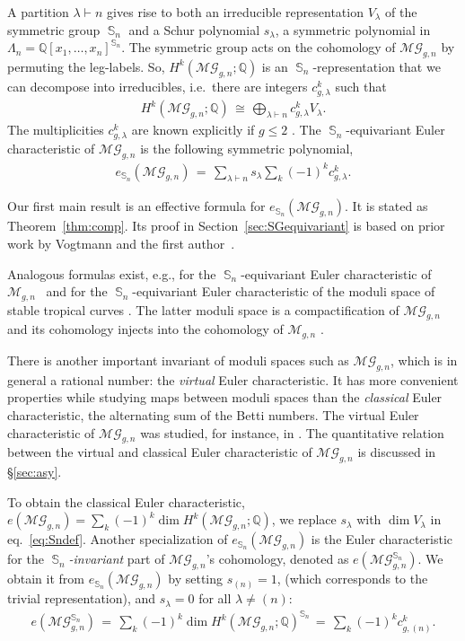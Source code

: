 \documentclass[oneside]{amsart}
\theoremstyle{remark}
\newcommand{\Q}{\mathbb{Q}}
\DeclareMathOperator{\SG}{{\mathbb S}}
\newcommand{\parts}{\vdash}
\newcommand{\MG}{\mathcal{MG}}
\begin{document}
%
%
%

%
%
%
A partition $\lambda \parts n$ gives rise to both an irreducible representation $V_\lambda$ of the symmetric group $\SG_n$ and a Schur polynomial $s_\lambda$, a symmetric polynomial in $\Lambda_n = \Q[x_1,\ldots,x_n]^{\SG_n}$. 
The symmetric group acts on the cohomology of $\MG_{g,n}$ by permuting the leg-labels. 
So, $H^k(\MG_{g,n};\Q)$ is an $\SG_n$-representation that we can decompose into irreducibles, i.e.~there are integers $c_{g,\lambda}^k$ such that
%
\begin{align*} H^k(\MG_{g,n};\Q)\, \cong\, \bigoplus_{\lambda \parts n} c_{g,\lambda}^k V_\lambda. \end{align*}
The multiplicities $c_{g,\lambda}^k$ are known explicitly if $g\leq 2$ \cite{conant2016assembling}.
The $\SG_n$-equivariant Euler characteristic of $\MG_{g,n}$ is the following symmetric polynomial,
%
\begin{align} \label{eq:Sndef} e_{\SG_n}(\MG_{g,n}) \,=\,\sum_{\lambda \parts n} s_\lambda \sum_{k} (-1)^k c_{g,\lambda}^k. \end{align}

Our first main result is an effective formula for $e_{\SG_n}(\MG_{g,n})$. It is stated as Theorem~\ref{thm:comp}. 
Its proof in Section~\ref{sec:SGequivariant} is based on prior work by Vogtmann and the first author~\cite{BV2}.

Analogous formulas exist, e.g., for the $\SG_n$-equivariant Euler characteristic of $\mathcal M_{g,n}$~\cite{gorsky2014equivariant} and for the $\SG_n$-equivariant Euler characteristic of  the moduli space of stable tropical curves \cite{chan2019s_n}. 
The latter moduli space is a compactification of $\mathcal {MG}_{g,n}$ and its cohomology injects into the cohomology of $\mathcal M_{g,n}$ \cite{CGP}. 
%

There is another important invariant of moduli spaces such as $\MG_{g,n}$, which is in general a rational number: the \emph{virtual} Euler characteristic. It has more convenient properties while studying maps between moduli spaces than the \emph{classical} Euler characteristic, the alternating sum of the Betti numbers.  The virtual Euler characteristic of $\MG_{g,n}$ was studied, for instance, in \cite{BV}. The quantitative relation between the virtual and classical Euler characteristic of $\MG_{g,n}$ is discussed in \S \ref{sec:asy}.

To obtain the classical Euler characteristic, $e(\MG_{g,n})=\sum_{k} (-1)^k \dim H^k(\MG_{g,n};\Q)$, we replace $s_\lambda$ with $\dim V_\lambda$ in eq.~\eqref{eq:Sndef}. Another specialization of $e_{\SG_n}(\MG_{g,n})$ is the Euler characteristic for the \emph{$\SG_n$-invariant} part of $\MG_{g,n}$'s cohomology, denoted as $e(\MG_{g,n}^{\SG_n})$. We obtain it from $e_{\SG_n}(\MG_{g,n})$ by setting $s_{(n)} =1$, (which corresponds to the trivial representation), and $s_{\lambda} = 0$ for all $\lambda \neq (n)$:
%
%
%
\begin{align*} e(\MG_{g,n}^{\SG_n})\,=\,\sum_{k} (-1)^k \dim H^k(\MG_{g,n};\Q)^{\SG_n}\,=\, \sum_k (-1)^k c_{g,(n)}^k. \end{align*}
\end{document}
